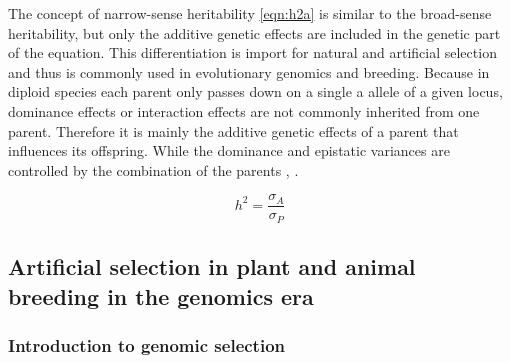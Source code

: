 The concept of narrow-sense heritability \ref{eqn:h2a} is similar to the broad-sense heritability, but only
the additive genetic effects are included in the genetic part of the equation. This differentiation is import
for natural and artificial selection and thus is commonly used in evolutionary genomics and breeding. Because
in diploid species each parent only passes down on a single a allele of a given locus, dominance effects or
interaction effects are not commonly inherited from one parent. Therefore it is mainly the additive
genetic effects of a parent that influences its offspring. While the dominance and epistatic variances are
controlled by the combination of the parents \cite{falconer1996}, \cite{walsh2018}.

\begin{equation}
 h^2 = \frac{\sigma_{A}}{\sigma_{P}}
 \label{eqn:h2a}
\end{equation}



\subsection{Artificial selection in plant and animal breeding in the genomics era}
\subsubsection{Introduction to genomic selection } \label{intro:gs}

